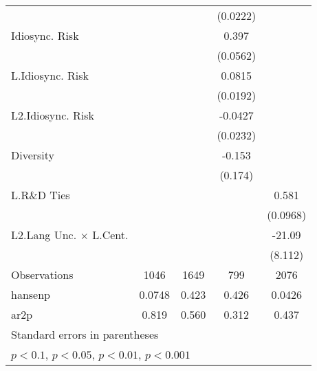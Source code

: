 {\begin{tabular}{l*{4}{c}}
                    &                     &                     &    (0.0222)         &                     \\
Idiosync. Risk      &                     &                     &       0.397\sym{***}&                     \\
                    &                     &                     &    (0.0562)         &                     \\
L.Idiosync. Risk    &                     &                     &      0.0815\sym{***}&                     \\
                    &                     &                     &    (0.0192)         &                     \\
L2.Idiosync. Risk   &                     &                     &     -0.0427\sym{+}  &                     \\
                    &                     &                     &    (0.0232)         &                     \\
Diversity           &                     &                     &      -0.153         &                     \\
                    &                     &                     &     (0.174)         &                     \\
L.R\&D Ties         &                     &                     &                     &       0.581\sym{***}\\
                    &                     &                     &                     &    (0.0968)         \\
L2.Lang Unc. $\times$ L.Cent.&                     &                     &                     &      -21.09\sym{**} \\
                    &                     &                     &                     &     (8.112)         \\
\hline
Observations        &        1046         &        1649         &         799         &        2076         \\
hansenp             &      0.0748         &       0.423         &       0.426         &      0.0426         \\
ar2p                &       0.819         &       0.560         &       0.312         &       0.437         \\
\hline\hline
\multicolumn{5}{l}{\footnotesize Standard errors in parentheses}\\
\multicolumn{5}{l}{\footnotesize \sym{+} \(p<0.1\), \sym{*} \(p<0.05\), \sym{**} \(p<0.01\), \sym{***} \(p<0.001\)}\\
\end{tabular}
}
